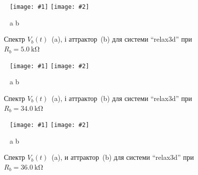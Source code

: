 \documentclass[14pt,handout,utf8]{beamer}
\newcommand{\Xhead}[1]{
 \begin{center}%
      \textbf{#1}%
 \end{center}%
}
\newcommand{\ABlbl}{%
  \vspace{-2.9ex}
  \begin{center}
    ~ \hfill a \hfill\hfill b \hfill ~
  \end{center}
  \vspace{-2.0ex}
}
\newcommand{\PicDouble}[2]{%
 \begin{center}
    ~ \hfill
    \texttt{[image: \#1]}
    \hfill
    \texttt{[image: \#2]}
    \hfill ~
  \end{center}
  \ABlbl
}
\begin{document}
\begin{frame}
  \frametitle{~}

  \Xhead{}

  \begin{figure}
    \PicDouble{../p7/p/relax3d_f_02.png}{../p7/p/relax3d_v1v2v3_02.png}
    \caption{Спектр $V_b(t)$~(a), і аттрактор~(b) для системи ``relax3d'' при $R_b = \SI{5.0}{\kilo \ohm} $}
    \label{atu:f:relax3d_f_02}
  \end{figure}

  \vspace{-3ex}

  \begin{figure}
    \PicDouble{../p7/p/relax3d_f_08.png}{../p7/p/relax3d_v1v2v3_08.png}
    \caption{Спектр $V_b(t)$~(a), і аттрактор~(b) для системи ``relax3d'' при $ R_b = \SI{34.0}{\kilo\ohm} $}
    \label{atu:f:relax3d_f_08}
  \end{figure}

  \vspace{-3ex}

  \begin{figure}
    \PicDouble{../p7/p/relax3d_f_09.png}{../p7/p/relax3d_v1v2v3_09.png}
    \caption{Спектр $V_b(t)$~(a), и аттрактор~(b) для системи ``relax3d'' при $R_b=\SI{36.0}{\kilo\ohm}$ }
    \label{atu:f:relax3d_f_09}
  \end{figure}

\end{frame}


\end{document}

